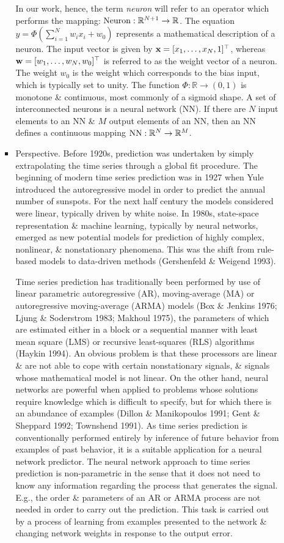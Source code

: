 \documentclass{article}
\begin{document}
\begin{enumerate}
\begin{itemize}
\begin{itemize}
			In our work, hence, the term {\it neuron} will refer to an operator which performs the mapping: ${\rm Neuron}:\mathbb{R}^{N+1}\to\mathbb{R}$. The equation $y = \Phi\left(\sum_{i=1}^N w_ix_i + w_0\right)$ represents a mathematical description of a neuron. The input vector is given by ${\bf x} = [x_1,\ldots,x_N,1]^\top$, whereas ${\bf w} = [w_1,\ldots,w_N,w_0]^\top$ is referred to as the weight vector of a neuron. The weight $w_0$ is the weight which corresponds to the bias input, which is typically set to unity. The function $\Phi:\mathbb{R}\to(0,1)$ is monotone \& continuous, most commonly of a sigmoid shape. A set of interconnected neurons is a neural network (NN).  If there are $N$ input elements to an NN \& $M$ output elements of an NN, then an NN defines a continuous mapping ${\rm NN}:\mathbb{R}^N\to\mathbb{R}^M$.
			\item {\sf Perspective.} Before 1920s, prediction was undertaken by simply extrapolating the time series through a global fit procedure. The beginning of modern time series prediction was in 1927 when Yule introduced the autoregressive model in order to predict the annual number of sunspots. For the next half century the models considered were linear, typically driven by white noise. In 1980s, state-space representation \& machine learning, typically by neural networks, emerged as new potential models for prediction of highly complex, nonlinear, \& nonstationary phenomena. This was the shift from rule-based models to data-driven methods (Gershenfeld \& Weigend 1993).
			
			Time series prediction has traditionally been performed by use of linear parametric autoregressive (AR), moving-average (MA) or autoregressive moving-average (ARMA) models (Box \& Jenkins 1976; Ljung \& Soderstrom 1983; Makhoul 1975), the parameters of which are estimated either in a block or a sequential manner with least mean square (LMS) or recursive least-squares (RLS) algorithms (Haykin 1994). An obvious problem is that these processors are linear \& are not able to cope with certain nonstationary signals, \& signals whose mathematical model is not linear. On the other hand, neural networks are powerful when applied to problems whose solutions require knowledge which is difficult to specify, but for which there is an abundance of examples (Dillon \& Manikopoulos 1991; Gent \& Sheppard 1992; Townshend 1991). As time series prediction is conventionally performed entirely by inference of future behavior from examples of past behavior, it is a suitable application for a neural network predictor. The neural network approach to time series prediction is non-parametric in the sense that it does not need to know any information regarding the process that generates the signal. E.g., the order \& parameters of an AR or ARMA process are not needed in order to carry out the prediction. This task is carried out by a process of learning from examples presented to the network \& changing network weights in response to the output error.
			

\end{itemize}
\end{itemize}
\end{enumerate}
\end{document}
